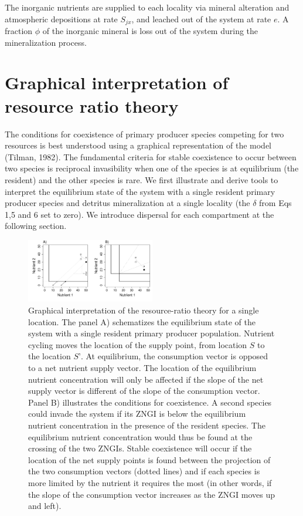 \documentclass[letterpaper,twocolumn,showkeys]{revtex4-1}
\begin{document}
The inorganic nutrients are supplied to each locality via mineral alteration and atmospheric depositions at rate $S_{jx}$, and leached out of the system at rate $e$. A fraction $\phi$ of the inorganic mineral is loss out of the system during the mineralization process.

\section{Graphical interpretation of resource ratio theory}

The conditions for coexistence of primary producer species competing for two resources is best understood using a graphical representation of the model (Tilman, 1982). The fundamental criteria for stable coexistence to occur between two species is reciprocal invasibility when one of the species is at equilibrium (the resident) and the other species is rare. We first illustrate and derive tools to interpret the equilibrium state of the system with a single resident primary producer species and detritus mineralization at a single locality (the $\delta$ from Eqs 1,5 and 6 set to zero). We introduce dispersal for each compartment at the following section. 

\begin{figure}[tb!]
   \centering
   \includegraphics[width=0.5\textwidth]{R-Ratio_theory.pdf}
   \caption{Graphical interpretation of the resource-ratio theory for a single location. The panel A) schematizes the equilibrium state of the system with a single resident primary producer population. Nutrient cycling moves the location of the supply point, from location $S$ to the location $S’$. At equilibrium, the consumption vector is opposed to a net nutrient supply vector. The location of the equilibrium nutrient concentration will only be affected if the slope of the net supply vector is different of the slope of the consumption vector. Panel B) illustrates the conditions for coexistence. A second species could invade the system if its ZNGI is below the equilibrium nutrient concentration in the presence of the resident species. The equilibrium nutrient concentration would thus be found at the crossing of the two ZNGIs. Stable coexistence will occur if the location of the net supply points is found between the projection of the two consumption vectors (dotted lines) and if each species is more limited by the nutrient it requires the most (in other words, if the slope of the consumption vector increases as the ZNGI moves up and left).}
   \label{f:R-Ratio_theory}
\end{figure}
\end{document}
